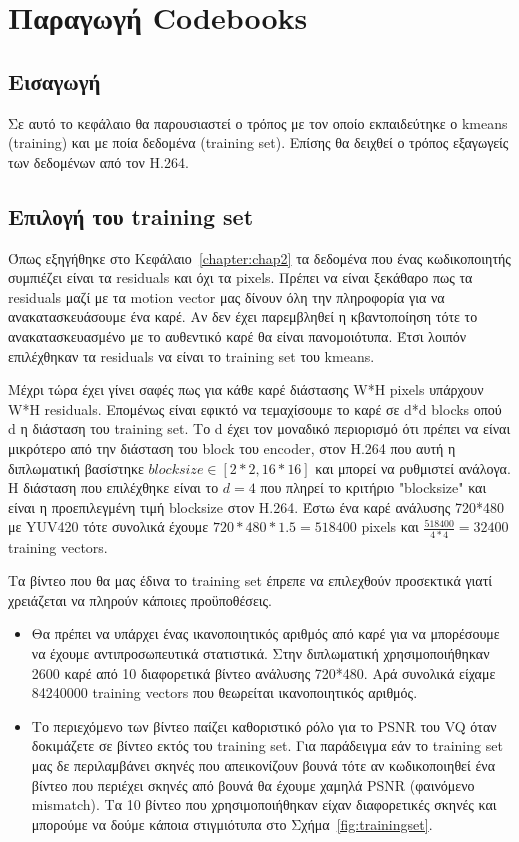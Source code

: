 ﻿\chapter{Παραγωγή Codebooks}
\label{chapter:chap4}

\section{Εισαγωγή}
\label{section:sect41}

\indent Σε αυτό το κεφάλαιο θα παρουσιαστεί ο τρόπος με τον οποίο εκπαιδεύτηκε ο kmeans (training) και με ποία δεδομένα (training set). Επίσης θα δειχθεί ο τρόπος εξαγωγείς των δεδομένων από τον H.264.

\section{Επιλογή του training set}
\label{section:sect42}

\indent Όπως εξηγήθηκε στο Κεφάλαιο~\ref{chapter:chap2} τα δεδομένα που ένας κωδικοποιητής συμπιέζει είναι τα residuals και όχι τα pixels. Πρέπει να είναι ξεκάθαρο πως τα residuals μαζί με τα motion vector μας δίνουν όλη την πληροφορία για να ανακατασκευάσουμε ένα καρέ. Αν δεν έχει παρεμβληθεί η κβαντοποίηση τότε το ανακατασκευασμένο με το αυθεντικό καρέ θα είναι πανομοιότυπα. Έτσι λοιπόν επιλέχθηκαν τα residuals να είναι το training set του kmeans.

\indent Μέχρι τώρα έχει γίνει σαφές πως για κάθε καρέ διάστασης W*H pixels υπάρχουν W*H residuals. Επομένως είναι εφικτό να τεμαχίσουμε το καρέ σε d*d blocks οπού d η διάσταση του training set. Το d έχει τον μοναδικό περιορισμό ότι πρέπει να είναι μικρότερο από την διάσταση του block του encoder, στον H.264 που αυτή η διπλωματική βασίστηκε $blocksize\in[2*2,16*16]$ και μπορεί να ρυθμιστεί ανάλογα. Η διάσταση που επιλέχθηκε είναι το $d=4$ που πληρεί το κριτήριο "blocksize" και είναι η προεπιλεγμένη τιμή blocksize στον H.264. Έστω ένα καρέ ανάλυσης 720*480 με YUV420 τότε συνολικά έχουμε $720*480*1.5=518400$ pixels και $ \frac{518400}{4*4} = 32400 $ training vectors.

\indent Τα βίντεο που θα μας έδινα το training set έπρεπε να επιλεχθούν προσεκτικά γιατί χρειάζεται να πληρούν κάποιες προϋποθέσεις.
\begin{itemize}
    \item Θα πρέπει να υπάρχει ένας ικανοποιητικός αριθμός από καρέ για να μπορέσουμε να έχουμε αντιπροσωπευτικά στατιστικά. Στην διπλωματική χρησιμοποιήθηκαν 2600 καρέ από 10 διαφορετικά βίντεο ανάλυσης 720*480. Αρά συνολικά είχαμε 84240000 training vectors που θεωρείται ικανοποιητικός αριθμός.
    \item Το περιεχόμενο των βίντεο παίζει καθοριστικό ρόλο για το PSNR του VQ όταν δοκιμάζετε σε βίντεο εκτός του training set. Για παράδειγμα εάν το training set μας δε περιλαμβάνει σκηνές που απεικονίζουν βουνά τότε αν κωδικοποιηθεί ένα βίντεο που περιέχει σκηνές από βουνά θα έχουμε χαμηλά PSNR (φαινόμενο mismatch). Τα 10 βίντεο που χρησιμοποιήθηκαν είχαν διαφορετικές σκηνές και μπορούμε να δούμε κάποια στιγμιότυπα στο Σχήμα~\ref{fig:trainingset}.
\end{itemize}

